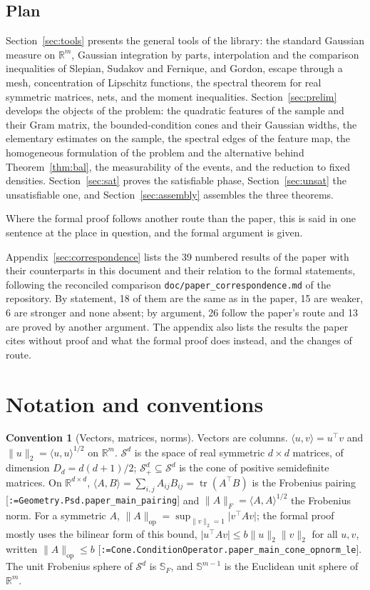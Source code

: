 \documentclass[11pt]{article}
\makeatletter
\newcommand{\formal@break}[1]{\@tfor\formal@tok:=#1\do{%
  \formal@tok
  \expandafter\ifx\formal@tok.\allowbreak\else
  \expandafter\ifx\formal@tok\_\allowbreak\fi\fi}}
\DeclareRobustCommand{\formal}[1]{\textnormal{[\texttt{\small\formal@break{#1}}]}}
\newcommand{\R}{\mathbb{R}}
\newcommand{\Sym}{\mathcal{S}}
\newcommand{\Spsd}{\mathcal{S}_{+}}
\newcommand{\ip}[2]{\langle #1, #2\rangle}
\newcommand{\norm}[1]{\lVert #1\rVert}
\newcommand{\abs}[1]{\lvert #1\rvert}
\newcommand{\tr}{\operatorname{tr}}
\newcommand{\op}{\mathrm{op}}
\newcommand{\Fro}{F}
\newcommand{\Dd}{D}
\theoremstyle{plain}
\theoremstyle{definition}
\newtheorem{convention}[theorem]{Convention}
\makeatother
\begin{document}
\subsection{Plan}

Section~\ref{sec:tools} presents the general tools of the library:
the standard Gaussian measure on $\R^m$, Gaussian integration by parts,
interpolation and the comparison inequalities of Slepian, Sudakov and
Fernique, and Gordon, escape through a mesh, concentration of Lipschitz
functions, the spectral theorem for real symmetric matrices, nets, and the
moment inequalities. Section~\ref{sec:prelim} develops the objects of the
problem: the quadratic features of the sample and their Gram matrix, the
bounded-condition cones and their Gaussian widths, the elementary estimates
on the sample, the spectral edges of the feature map, the homogeneous
formulation of the problem and the alternative behind
Theorem~\ref{thm:bal}, the measurability of the events, and the reduction
to fixed densities. Section~\ref{sec:sat} proves the satisfiable phase,
Section~\ref{sec:unsat} the unsatisfiable one, and Section~\ref{sec:assembly}
assembles the three theorems.

Where the formal proof follows another route than the paper, this is said
in one sentence at the place in question, and the formal argument is given.

Appendix~\ref{sec:correspondence} lists the 39 numbered results of the
paper with their counterparts in this document and their relation to the
formal statements, following the reconciled comparison
\texttt{doc/paper\_correspondence.md} of the repository. By statement, 18 of them are the same as in the paper, 15 are weaker,
6 are stronger and none absent; by argument, 26 follow the paper's route and
13 are proved by another argument. The appendix also lists the results
the paper cites without proof and what the formal proof does instead,
and the changes of route.

\section{Notation and conventions}\label{sec:notation}

\begin{convention}[Vectors, matrices, norms]
Vectors are columns. $\ip{u}{v} = u^{\top} v$ and $\norm{u}_2 = \ip{u}{u}^{1/2}$ on $\R^m$.
$\Sym^d$ is the space of real symmetric $d\times d$ matrices, of dimension
$\Dd_d = d(d+1)/2$; $\Spsd^d \subseteq \Sym^d$ is the cone of positive
semidefinite matrices. On $\R^{d \times d}$, $\ip{A}{B} = \sum_{i,j} A_{ij} B_{ij} = \tr(A^{\top} B)$
is the Frobenius pairing \formal{Geometry.Psd.paper\_main\_pairing} and
$\norm{A}_\Fro = \ip{A}{A}^{1/2}$ the Frobenius norm. For a symmetric
$A$, $\norm{A}_\op = \sup_{\norm{v}_2 = 1} \abs{v^{\top} A v}$; the formal
proof mostly uses the bilinear form of this bound,
$\abs{u^{\top} A v} \le b \norm{u}_2 \norm{v}_2$ for all $u, v$, written
$\norm{A}_\op \le b$ \formal{Cone.ConditionOperator.paper\_main\_cone\_opnorm\_le}.
The unit Frobenius sphere of $\Sym^d$ is $\mathbb{S}_\Fro$, and
$\mathbb{S}^{m-1}$ is the Euclidean unit sphere of $\R^m$.
\end{convention}
\end{document}

